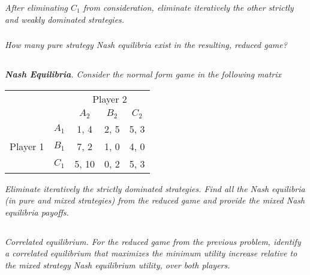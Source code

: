 \documentclass[12pt]{amsart}
\begin{document}
	\subsubsection{}
	\textit{After eliminating $C_1$ from consideration, eliminate iteratively the other strictly and
	weakly dominated strategies.}
 
	\subsubsection{}
	\textit{How many pure strategy Nash equilibria exist in the resulting, reduced game?}




\subsection{}
\textit{\textbf{Nash Equilibria}. Consider the normal form game in the following matrix}

\begin{center}
	\def\arraystretch{1.25}%
	\begin{tabular}{ccccc}
		&                            & \multicolumn{3}{c}{Player 2}                                                         \\
		& \multicolumn{1}{c|}{}      & \multicolumn{1}{c|}{$A_2$} & \multicolumn{1}{c|}{$B_2$} & \multicolumn{1}{c|}{$C_2$} \\ \cline{2-5} 
		& \multicolumn{1}{c|}{$A_1$} & \multicolumn{1}{c|}{1, 4}  & \multicolumn{1}{c|}{2, 5}  & \multicolumn{1}{c|}{5, 3}  \\ \cline{2-5} 
		Player 1 & \multicolumn{1}{c|}{$B_1$} & \multicolumn{1}{c|}{7, 2}  & \multicolumn{1}{c|}{1, 0}  & \multicolumn{1}{c|}{4, 0}  \\ \cline{2-5} 
		& \multicolumn{1}{c|}{$C_1$} & \multicolumn{1}{c|}{5, 10} & \multicolumn{1}{c|}{0, 2}  & \multicolumn{1}{c|}{5, 3}  \\ \cline{2-5} 
	\end{tabular}
\end{center}

\textit{Eliminate iteratively the strictly dominated strategies. Find all the Nash equilibria (in pure
	and mixed strategies) from the reduced game and provide the mixed Nash equilibria
	payoffs.}



\subsection{}
\textit{Correlated equilibrium. For the reduced game from the previous problem, identify a
	correlated equilibrium that maximizes the minimum utility increase relative to the mixed strategy Nash equilibrium utility, over both players.}
\end{document}
